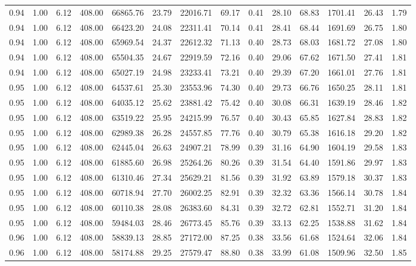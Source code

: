 \begin{table}[!ht]
\begin{tabular}{rrrrrrrrrrrrrr}
0.94 & 1.00 & 6.12 & 408.00 & 66865.76 & 23.79 & 22016.71 & 69.17 & 0.41 & 28.10 & 68.83 & 1701.41 & 26.43 & 1.79 \\
0.94 & 1.00 & 6.12 & 408.00 & 66423.20 & 24.08 & 22311.41 & 70.14 & 0.41 & 28.41 & 68.44 & 1691.69 & 26.75 & 1.80 \\
0.94 & 1.00 & 6.12 & 408.00 & 65969.54 & 24.37 & 22612.32 & 71.13 & 0.40 & 28.73 & 68.03 & 1681.72 & 27.08 & 1.80 \\
0.94 & 1.00 & 6.12 & 408.00 & 65504.35 & 24.67 & 22919.59 & 72.16 & 0.40 & 29.06 & 67.62 & 1671.50 & 27.41 & 1.81 \\
0.94 & 1.00 & 6.12 & 408.00 & 65027.19 & 24.98 & 23233.41 & 73.21 & 0.40 & 29.39 & 67.20 & 1661.01 & 27.76 & 1.81 \\
0.95 & 1.00 & 6.12 & 408.00 & 64537.61 & 25.30 & 23553.96 & 74.30 & 0.40 & 29.73 & 66.76 & 1650.25 & 28.11 & 1.81 \\
0.95 & 1.00 & 6.12 & 408.00 & 64035.12 & 25.62 & 23881.42 & 75.42 & 0.40 & 30.08 & 66.31 & 1639.19 & 28.46 & 1.82 \\
0.95 & 1.00 & 6.12 & 408.00 & 63519.22 & 25.95 & 24215.99 & 76.57 & 0.40 & 30.43 & 65.85 & 1627.84 & 28.83 & 1.82 \\
0.95 & 1.00 & 6.12 & 408.00 & 62989.38 & 26.28 & 24557.85 & 77.76 & 0.40 & 30.79 & 65.38 & 1616.18 & 29.20 & 1.82 \\
0.95 & 1.00 & 6.12 & 408.00 & 62445.04 & 26.63 & 24907.21 & 78.99 & 0.39 & 31.16 & 64.90 & 1604.19 & 29.58 & 1.83 \\
0.95 & 1.00 & 6.12 & 408.00 & 61885.60 & 26.98 & 25264.26 & 80.26 & 0.39 & 31.54 & 64.40 & 1591.86 & 29.97 & 1.83 \\
0.95 & 1.00 & 6.12 & 408.00 & 61310.46 & 27.34 & 25629.21 & 81.56 & 0.39 & 31.92 & 63.89 & 1579.18 & 30.37 & 1.83 \\
0.95 & 1.00 & 6.12 & 408.00 & 60718.94 & 27.70 & 26002.25 & 82.91 & 0.39 & 32.32 & 63.36 & 1566.14 & 30.78 & 1.84 \\
0.95 & 1.00 & 6.12 & 408.00 & 60110.38 & 28.08 & 26383.60 & 84.31 & 0.39 & 32.72 & 62.81 & 1552.71 & 31.20 & 1.84 \\
0.95 & 1.00 & 6.12 & 408.00 & 59484.03 & 28.46 & 26773.45 & 85.76 & 0.39 & 33.13 & 62.25 & 1538.88 & 31.62 & 1.84 \\
0.96 & 1.00 & 6.12 & 408.00 & 58839.13 & 28.85 & 27172.00 & 87.25 & 0.38 & 33.56 & 61.68 & 1524.64 & 32.06 & 1.84 \\
0.96 & 1.00 & 6.12 & 408.00 & 58174.88 & 29.25 & 27579.47 & 88.80 & 0.38 & 33.99 & 61.08 & 1509.96 & 32.50 & 1.85 \\

\end{tabular}
\end{table}

